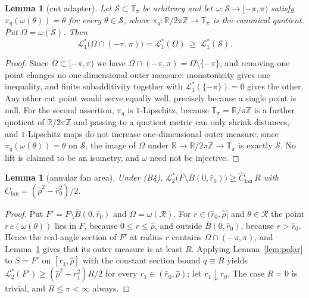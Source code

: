 \documentclass[11pt]{article}
\theoremstyle{plain}
\newtheorem{lemma}[theorem]{Lemma}
\theoremstyle{definition}
\theoremstyle{remark}
\newcommand{\R}{\mathbb{R}}
\newcommand{\Z}{\mathbb{Z}}
\newcommand{\Tp}{\mathbb{T}_{\pi}}
\newcommand{\Lout}{\mathcal{L}^{*}_{2}}
\newcommand{\Lone}{\mathcal{L}^{*}_{1}}
\begin{document}
\begin{lemma}[cut adapter]\label{lem:anncut}
Let $\mathcal S\subset\Tp$ be arbitrary and let
$\omega:\mathcal S\to[-\pi,\pi)$ satisfy
$\pi_{q}(\omega(\theta))=\theta$ for every $\theta\in\mathcal S$, where
$\pi_{q}:\R/2\pi\Z\to\Tp$ is the canonical quotient. Put
$\Omega=\omega(\mathcal S)$. Then
\[
  \Lone\bigl(\Omega\cap(-\pi,\pi)\bigr)=\Lone(\Omega)\ \ge\ \Lone(\mathcal S).
\]
\end{lemma}

\begin{proof}
Since $\Omega\subset[-\pi,\pi)$ we have
$\Omega\cap(-\pi,\pi)=\Omega\setminus\{-\pi\}$, and removing one point changes
no one-dimensional outer measure: monotonicity gives one inequality, and finite
subadditivity together with $\Lone(\{-\pi\})=0$ gives the other. Any other cut
point would serve equally well, precisely because a single point is null. For
the second assertion, $\pi_{q}$ is $1$-Lipschitz, because $\Tp=\R/\pi\Z$ is a
further quotient of $\R/2\pi\Z$ and passing to a quotient metric can only
shrink distances, and $1$-Lipschitz maps do not increase one-dimensional outer
measure; since $\pi_{q}(\omega(\theta))=\theta$ on $\mathcal S$, the image of
$\Omega$ under $\R\to\R/2\pi\Z\to\Tp$ is exactly $\mathcal S$. No lift is
claimed to be an isometry, and $\omega$ need not be injective.
\end{proof}

\begin{lemma}[annular fan area]\label{lem:annfan}
Under (B4),
$\Lout\bigl(F\setminus\overline B(0,\hat r_{0})\bigr)
\ge\hat C_{\mathrm{fan}}\,R$ with
$\hat C_{\mathrm{fan}}=(\hat\rho^{2}-\hat r_{0}^{2})/2$.
\end{lemma}

\begin{proof}
Put $F'=F\setminus\overline B(0,\hat r_{0})$ and
$\Omega=\omega(\mathcal R)$. For $r\in(\hat r_{0},\hat\rho]$ and
$\theta\in\mathcal R$ the point $r\,e(\omega(\theta))$ lies in $F$, because
$0\le r\le\hat\rho$, and outside $\overline B(0,\hat r_{0})$, because
$r>\hat r_{0}$. Hence the real-angle section of $F'$ at radius $r$ contains
$\Omega\cap(-\pi,\pi)$, and Lemma~\ref{lem:anncut} gives that its outer measure
is at least $R$. Applying Lemma~\ref{lem:polar} to $S=F'$ on $[r_{1},\hat\rho]$
with the constant section bound $q\equiv R$ yields
$\Lout(F')\ge(\hat\rho^{2}-r_{1}^{2})R/2$ for every
$r_{1}\in(\hat r_{0},\hat\rho)$; let $r_{1}\downarrow\hat r_{0}$. The case
$R=0$ is trivial, and $R\le\pi<\infty$ always.
\end{proof}
\end{document}
